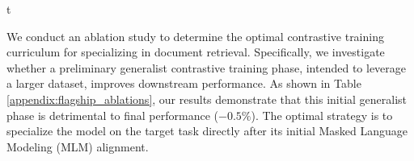 \begin{table}{t}
\centering
\renewcommand{\arraystretch}{1.2}
\small
{}
\caption[\flagship{} curriculum performance]{\textbf{Performance of \flagship{} Document Specialisation Curriculums.} This table presents the performance of various contrastive training curriculums starting from \flagship{}-base, on the \textsc{ViDoRe}(v1) and \textsc{ViDoRe}(v2) benchmarks. The generalist contrastive learning mix used in the last two models is detailed in Table~\ref{tab:cl_mix}. We see that a preliminary stage of generalist contrastive learning harms the final document retrieval performance, regardless of whether a multi-vector approach is used.}
\label{appendix:flagship_ablations}
\end{table}


We conduct an ablation study to determine the optimal contrastive training curriculum for specializing \flagship{} in document retrieval. Specifically, we investigate whether a preliminary generalist contrastive training phase, intended to leverage a larger dataset, improves downstream performance. As shown in Table \ref{appendix:flagship_ablations}, our results demonstrate that this initial generalist phase is detrimental to final performance ($-0.5\%$). The optimal strategy is to specialize the model on the target task directly after its initial Masked Language Modeling (MLM) alignment.

